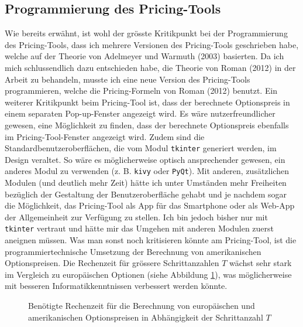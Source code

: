 \documentclass[11pt]{report} %
\begin{document}
\subsection{Programmierung des Pricing-Tools}
Wie bereits erwähnt, ist wohl der grösste Kritikpunkt bei der Programmierung des Pricing-Tools, dass ich mehrere Versionen des Pricing-Tools geschrieben habe, welche auf der Theorie von Adelmeyer und Warmuth (2003) basierten. Da ich mich schlussendlich dazu entschieden habe, die Theorie von Roman (2012) in der Arbeit zu behandeln, musste ich eine neue Version des Pricing-Tools programmieren, welche die Pricing-Formeln von Roman (2012) benutzt. Ein weiterer Kritikpunkt beim Pricing-Tool ist, dass der berechnete Optionspreis in einem separaten Pop-up-Fenster angezeigt wird. Es wäre nutzerfreundlicher gewesen, eine Möglichkeit zu finden, dass der berechnete Optionspreis ebenfalls im Pricing-Tool-Fenster angezeigt wird. Zudem sind die Standardbenutzeroberflächen, die vom Modul \texttt{tkinter} generiert werden, im Design veraltet. So wäre es möglicherweise optisch ansprechender gewesen, ein anderes Modul zu verwenden (z. B. \texttt{kivy} oder \texttt{PyQt}). Mit anderen, zusätzlichen Modulen (und deutlich mehr Zeit) hätte ich unter Umständen mehr Freiheiten bezüglich der Gestaltung der Benutzeroberfläche gehabt und je nachdem sogar die Möglichkeit, das Pricing-Tool als App für das Smartphone oder als Web-App der Allgemeinheit zur Verfügung zu stellen. Ich bin jedoch bisher nur mit \texttt{tkinter} vertraut und hätte mir das Umgehen mit anderen Modulen zuerst aneignen müssen. Was man sonst noch kritisieren könnte am Pricing-Tool, ist die programmiertechnische Umsetzung der Berechnung von amerikanischen Optionspreisen. Die Rechenzeit für grössere Schrittanzahlen $T$ wächst sehr stark im Vergleich zu europäischen Optionen (siehe Abbildung \ref{fig:runtime}), was möglicherweise mit besseren Informatikkenntnissen verbessert werden könnte.
\begin{figure}[h]
    \centering
    \caption{Benötigte Rechenzeit für die Berechnung von europäischen und amerikanischen Optionspreisen in Abhängigkeit der Schrittanzahl $T$}
    \label{fig:runtime}
\end{figure}
\end{document}
